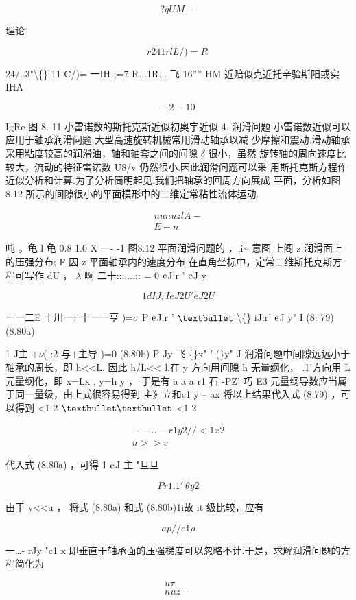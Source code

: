 \[?qUM-\]

理论

\[r 24 1 rl L/)= R~\]

24/..3"\textbackslash\{\} 11 C/)= 一IH ;=7 R...1R... 飞 16'''' HM 近赔似克近托辛验斯阳或实IHA

\[-2 -1 0\]

IgRe 图 8. 11 小雷诺数的斯托克斯近似初奥宇近似 4. 润滑问题 小雷诺数近似可以应用于轴承润滑问题.大型高速旋转机械常用滑动轴承以减 少摩擦和震动.滑动轴承采用粘度较高的润滑油，轴和轴套之间的间隙 $\delta$ 很小，虽然 旋转轴的周向速度比较大，流动的特征雷诺数 U8/v 仍然很小.因此润滑问题可以采 用斯托克斯方程作近似分析和计算.为了分析简明起见.我们把轴承的回周方向展成 平面，分析如图 8.12 所示的间隙很小的平面模形中的二维定常粘性流体运动.

\begin{gather*}
nunu zlA-\\
E-n
\end{gather*}

吨 。龟 l 龟 0.8 1.0 X 一- -1 图8.12 平面润滑问题的 ，;i\textasciitilde{} 意图 上阁 z 润滑面上的压强分布; F 因 z 平面轴承内的速度分布 在直角坐标中，定常二维斯托克斯方程可写作 dU ， $\lambda$ 啊 二十:::....:: = 0 ${\rm e}$J:r ' ${\rm e}$J y

\[1 d IJ , I eJ 2 U ' eJ 2 U  \]

一一二E 十川一$\tau$ 十一一亨 )=$\sigma$ P ${\rm e}$J:r ' ${\rm •}$ \textbackslash\{\} iJ:r' ${\rm e}$J y" I (8. 79) (8.80a)

1 J主 +$\nu$( :2 与+主导 )=0 (8.80b) P Jy 飞 \{\}x" ' (\}y" J 润滑问题中间隙远远小于轴承的周长，即 h<<L. 因此 h/L<< l.在 y 方向用间隙 h 无量纲化， .1'方向用 L 元量纲化，即 x=Lx , y=h y ， 于是有 a a a r1 石 -PZ' 巧 E3 元量纲导数应当属于同一量级，由上式很容易得到 主》立和c1 y -- ax 将以上结果代入式 (8.79) ，可以得到 <1 2 ${\rm ••}$ <1 2

\begin{gather*}
-- ..-r1 y2 // <1x 2\\
u>> v
\end{gather*}

代入式 (8.80a) ，可得 1 ${\rm e}$J 主-"旦旦

\[P r1.1' ~\theta  y2\]

由于 v<<u ， 将式 (8.80a) 和式 (8.80b)1i故 it 级比较，应有

\[ap // c1 \rho \]

一…- rJy "c1 x 即垂直于轴承面的压强梯度可以忽略不计.于是，求解润滑问题的方程简化为

\begin{gather*}
u\tau \\
nuz-
\end{gather*}

